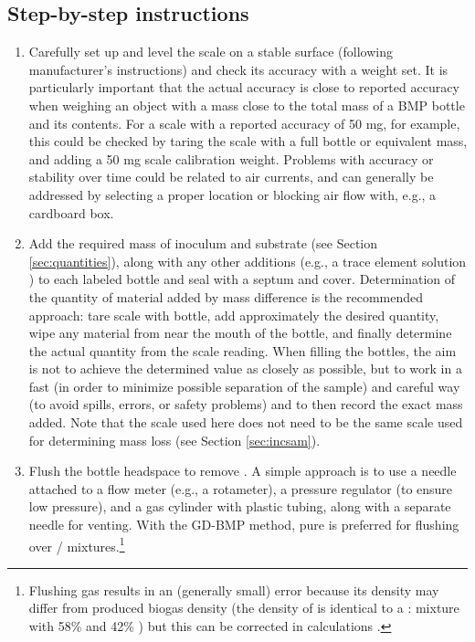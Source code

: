 \documentclass[]{article}
\begin{document}
\subsection{Step-by-step instructions}
\begin{enumerate}
  \item Carefully set up and level the scale on a stable surface (following manufacturer's instructions) and check its accuracy with a weight set. 
      It is particularly important that the actual accuracy is close to reported accuracy when weighing an object with a mass close to the total mass of a BMP bottle and its contents. 
      For a scale with a reported accuracy of 50 mg, for example, this could be checked by taring the scale with a full bottle or equivalent mass, and adding a 50 mg scale calibration weight.
      Problems with accuracy or stability over time could be related to air currents, and can generally be addressed by selecting a proper location or blocking air flow with, e.g., a cardboard box.
    \item Add the required mass of inoculum and substrate (see Section \ref{sec:quantities}), along with any other additions (e.g., a trace element solution \citep{holligerStandardizationBiomethanePotential2016}) to each labeled bottle and seal with a septum and cover. 
      Determination of the quantity of material added by mass difference is the recommended approach: tare scale with bottle, add approximately the desired quantity, wipe any material from near the mouth of the bottle, and finally determine the actual quantity from the scale reading. 
      When filling the bottles, the aim is not to achieve the determined value as closely as possible, but to work in a fast (in order to minimize possible separation of the sample) and careful way (to avoid spills, errors, or safety problems) and to then record the exact mass added.
      Note that the scale used here does not need to be the same scale used for determining mass loss (see Section \ref{sec:incsam}).
    \item Flush the bottle headspace to remove . 
      A simple approach is to use a needle attached to a flow meter (e.g., a rotameter), a pressure regulator (to ensure low pressure), and a gas cylinder with plastic tubing, along with a separate needle for venting. With the GD-BMP method, pure  is preferred for flushing over / mixtures.\footnote{
        Flushing gas results in an (generally small) error because its density may differ from produced biogas density (the density of  is identical to a : mixture with 58\%  and 42\% ) but this can be corrected in calculations \citep{justesenDevelopmentValidationLowcost2019}.
}
\end{enumerate}
\end{document}
